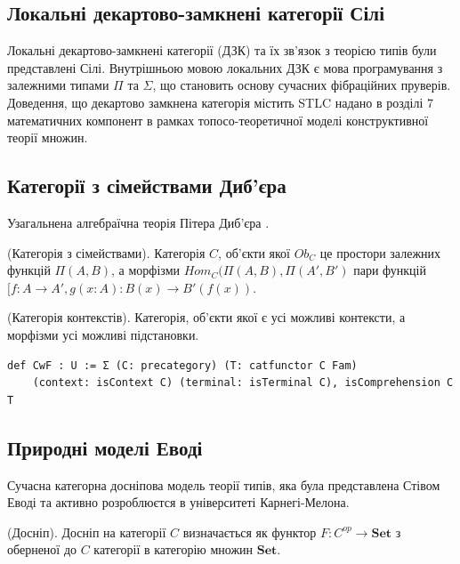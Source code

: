 \newpage
\subsection{Локальні декартово-замкнені категорії Сілі}
Локальні декартово-замкнені категорії (ДЗК) та їх зв'язок з теорією типів були представлені Сілі\cite{Seely84}.
Внутрішньою мовою локальних ДЗК є мова програмування з залежними типами $\Pi$ та $\Sigma$, що становить основу сучасних фібраційних пруверів.
Доведення, що декартово замкнена категорія містить STLC надано в розділі 7 математичних компонент
в рамках топосо-теоретичної моделі конструктивної теорії множин.

\subsection{Категорії з сімействами Диб'єра}
Узагальнена алгебраїчна теорія Пітера Диб'єра \cite{Dybjer95}\cite{Dybjer08}\cite{Abel08}.

\begin{definition} (Категорія з сімействами). Категорія $C$, об'єкти якої $Ob_C$ це простори залежних функцій $\Pi(A,B)$,
а морфізми $Hom_C(\Pi(A,B),\Pi(A',B')$ пари функцій $[f:A \rightarrow A',g(x:A) : B(x) \rightarrow B'(f(x))$.
\end{definition}

\begin{definition} (Категорія контекстів). Категорія, об'єкти якої є усі можливі контексти,
а морфізми усі можливі підстановки.
\end{definition}

\begin{lstlisting}
def CwF : U := Σ (C: precategory) (T: catfunctor C Fam)
    (context: isContext C) (terminal: isTerminal C), isComprehension C T
\end{lstlisting}


\newpage
\subsection{Природні моделі Еводі}
Сучасна категорна досніпова модель теорії типів, яка була представлена Стівом Еводі та активно
розроблюєтся в університеті Карнегі-Мелона.

\begin{definition} (Досніп). Досніп на категорії $C$ визначається як
функтор $F: C^{op} \rightarrow \mathbf{Set}$ з оберненої до $C$ категорії
в категорію множин $\mathbf{Set}$.
\end{definition}

